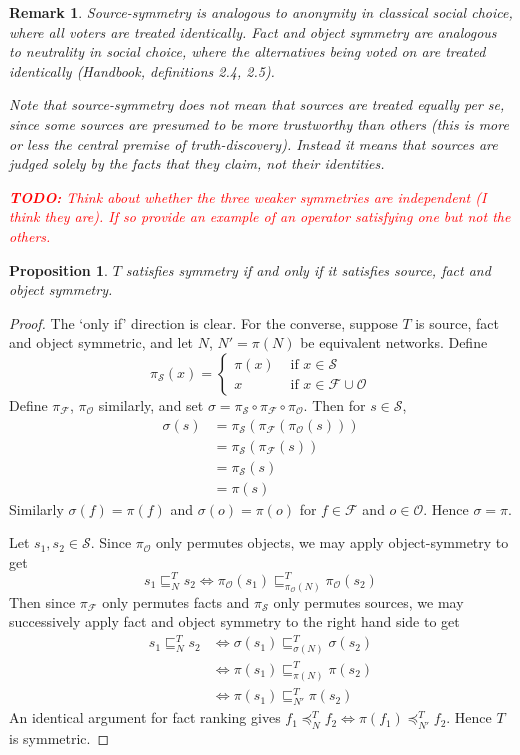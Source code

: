 \documentclass{article}
\theoremstyle{definition} \newtheorem{definition}{Definition}
\theoremstyle{definition} \newtheorem{example}{Example}
\theoremstyle{plain} \newtheorem{axiom}{Axiom}
\theoremstyle{plain} \newtheorem*{remark}{Remark}
\theoremstyle{remark} \newtheorem*{notation}{Notation}
\theoremstyle{plain} \newtheorem{lemma}{Lemma}
\theoremstyle{plain} \newtheorem{proposition}{Proposition}
\newcommand{\todo}[1] {
    \textcolor{red}{
        \textbf{TODO:} #1
    }
}
\renewcommand{\S}{\mathcal{S}}  %
\renewcommand{\O}{\mathcal{O}}  %
\newcommand{\F}{\mathcal{F}}
\newcommand{\sle}{\sqsubseteq}
\newcommand{\fle}{\preceq}
\begin{document}
\begin{remark}
Source-symmetry is analogous to \emph{anonymity} in classical social choice,
where all voters are treated identically. Fact and object symmetry are
analogous to \emph{neutrality} in social choice, where the alternatives being
voted on are treated identically (Handbook, definitions 2.4, 2.5).

Note that source-symmetry does not mean that sources are treated \emph{equally}
per se, since some sources are presumed to be more trustworthy than others
(this is more or less the central premise of truth-discovery). Instead it means
that sources are judged solely by the facts that they claim, not their
identities.

\todo{Think about whether the three weaker symmetries are independent (I think
they are). If so provide an example of an operator satisfying one but not the
others.}
\end{remark}

\begin{proposition}
$T$ satisfies symmetry if and only if it satisfies source, fact and object
symmetry.
\end{proposition}

\begin{proof}
The `only if' direction is clear. For the converse, suppose $T$ is source, fact
and object symmetric, and let $N$, $N'=\pi(N)$ be equivalent networks. Define
\begin{equation*}
\pi_\S(x) = \begin{cases}
    \pi(x) & \text{ if } x \in \S \\
    x      & \text{ if } x \in \F \cup \O
\end{cases}
\end{equation*}
Define $\pi_\F$, $\pi_\O$ similarly, and set $\sigma = \pi_\S \circ \pi_\F
\circ \pi_\O$. Then for $s \in \S$,
\begin{align*}
\sigma(s) &= \pi_\S(\pi_\F(\pi_\O(s))) \\
          &= \pi_\S(\pi_\F(s)) \\
          &= \pi_\S(s) \\
          &= \pi(s)
\end{align*}
Similarly $\sigma(f)=\pi(f)$ and $\sigma(o)=\pi(o)$ for $f \in \F$ and $o \in
\O$. Hence $\sigma=\pi$.

Let $s_1, s_2 \in \S$. Since $\pi_\O$ only permutes objects, we may apply
object-symmetry to get
$$ s_1 \sle_N^T s_2 \iff \pi_\O(s_1) \sle_{\pi_\O(N)}^T \pi_\O(s_2) $$
Then since $\pi_\F$ only permutes facts and $\pi_\S$ only permutes sources, we
may successively apply fact and object symmetry to the right hand side to get
\begin{align*}
s_1 \sle_N^T s_2 & \iff \sigma(s_1) \sle_{\sigma(N)}^T \sigma(s_2) \\
                 & \iff \pi(s_1) \sle_{\pi(N)}^T \pi(s_2) \\
                 & \iff \pi(s_1) \sle_{N'}^T \pi(s_2)
\end{align*}
An identical argument for fact ranking gives $f_1 \fle_N^T f_2 \iff \pi(f_1)
\fle_{N'}^T f_2$. Hence $T$ is symmetric.

\end{proof}
\end{document}
